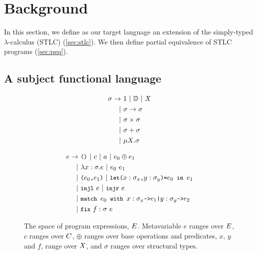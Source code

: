 \section{Background}
\label{sec:background}
%
In this section, we define as our target language an extension of the
simply-typed $\lambda$-calculus (STLC) (\autoref{sec:stlc}).
%
We then define partial equivalence of STLC programs
(\autoref{sec:peq}).

\subsection{A subject functional language}
\label{sec:stlc}
\begin{figure}[t]
  \begin{minipage}{0.36\linewidth}
    \begin{align*} %
      \sigma \rightarrow &\ \unitty\ |\ \basety\ |\ X \\
      | &\ \sigma \rightarrow \sigma \\
      | &\ \sigma \times \sigma \\
      | &\ \sigma + \sigma \\
      | &\ \mu X. \sigma
    \end{align*}
    \caption{The space of structural types, $\types$.
      Metavariable $\sigma$ ranges over $\types$ and $X$ ranges over
      least-fixed point variables.} %
    \label{fig:types}
  \end{minipage}
  \qquad
  \begin{minipage}{0.55\linewidth}
    \begin{align*}
      e \rightarrow &\ \unit\ 
                      |\ c\
                      |\ a\ 
                      |\ e_0 \oplus e_1 \\
      | &\ \abs{ x }{ \sigma }{ e } \
          | \ e_0\ e_1 \\
      | &\ \pair{e_0}{e_1} \
          |\ \letexp{x}{\sigma_x }{y}{\sigma_y }{e_0}{e_1} \\
      | &\ \injl\ e\ |\ \injr\ e\ \\
      | &\ \matchexp{e_0}{x}{\sigma_x}{e_1}{y}{\sigma_y}{e_2} \\
      | &\ \fix{f}{\sigma}{e}
    \end{align*}
    \caption{The space of program expressions, $E$.
      Metavariable $e$ ranges over $E$, %
      $c$ ranges over $C$, %
      $\oplus$ ranges over base operations and predicates, %
      $x$, $y$ and $f$, range over $X$, and %
      $\sigma$ ranges over structural types. } %
    \label{fig:exprs}
  \end{minipage}
  \qquad
\end{figure}

